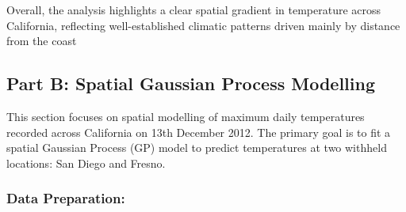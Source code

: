 \documentclass[
  11pt,
]{article}
\begin{document}
Overall, the analysis highlights a clear spatial gradient in temperature
across California, reflecting well-established climatic patterns driven
mainly by distance from the coast

\subsection{Part B: Spatial Gaussian Process
Modelling}\label{part-b-spatial-gaussian-process-modelling}

This section focuses on spatial modelling of maximum daily temperatures
recorded across California on 13th December 2012. The primary goal is to
fit a spatial Gaussian Process (GP) model to predict temperatures at two
withheld locations: San Diego and Fresno.

\subsubsection{Data Preparation:}\label{data-preparation}
\end{document}
